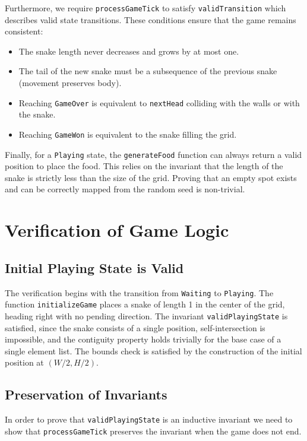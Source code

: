 \documentclass[letterpaper, 11pt]{article}
\begin{document}
Furthermore, we require \texttt{processGameTick} to satisfy
\texttt{validTransition} which describes valid state transitions.
These conditions ensure that the game remains consistent:
\begin{itemize}
    \item The snake length never decreases and grows by at most one.
    \item The tail of the new snake must be a subsequence of the previous snake
        (movement preserves body).
    \item Reaching \texttt{GameOver} is equivalent to \texttt{nextHead} colliding with
        the walls or with the snake.
    \item Reaching \texttt{GameWon} is equivalent to the snake filling the grid.
\end{itemize}

Finally, for a \texttt{Playing} state, the \texttt{generateFood} function can
always return a valid position to place the food. This relies on the invariant that the length of
the snake is strictly less than the size of the grid.
Proving that an empty spot exists and can be correctly mapped from the random seed is non-trivial.


\section{Verification of Game Logic}
\subsection{Initial Playing State is Valid}
The verification begins with the transition from \texttt{Waiting} to
\texttt{Playing}.
The function \texttt{initializeGame} places a snake of length 1 in the center of the
grid, heading right with no pending direction.
The invariant \texttt{validPlayingState} is satisfied, since the snake consists of a
single position, self-intersection is impossible, and the contiguity property holds trivially for
the base case of a single element list. The bounds check is satisfied by the construction of the
initial position at $(W/2, H/2)$.

\subsection{Preservation of Invariants}
In order to prove that \texttt{validPlayingState} is an inductive invariant we need to
show that \newline
\texttt{processGameTick} preserves the invariant when the game does not end.
\end{document}
